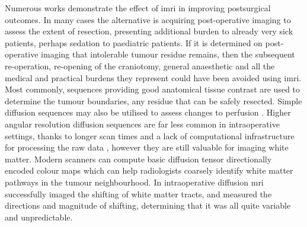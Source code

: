 Numerous works demonstrate the effect of \gls{imri} in improving postsurgical outcomes.
In many cases the alternative is acquiring post-operative imaging to assess the extent of resection, presenting additional burden to already very sick patients, perhaps sedation to paediatric patients.
If it is determined on post-operative imaging that intolerable tumour residue remains, then the subsequent re-operation, re-opening of the craniotomy, general anaesthetic and all the medical and practical burdens they represent could have been avoided using \gls{imri}.
Most commonly, sequences providing good anatomical tissue contrast are used to determine the tumour boundaries, any residue that can be safely resected.
Simple diffusion sequences may also be utilised to assess changes to perfusion .
Higher angular resolution diffusion sequences are far less common in intraoperative settings, thanks to longer scan times and a lack of computational infrastructure for processing the raw data , however they are still valuable for imaging white matter.
Modern scanners can compute basic diffusion tensor directionally encoded colour maps which can help radiologists coarsely identify white matter pathways in the tumour neighbourhood.
In  intraoperative diffusion \gls{mri} successfully imaged the shifting of white matter tracts, and  measured the directions and magnitude of shifting, determining that it was all quite variable and unpredictable.

